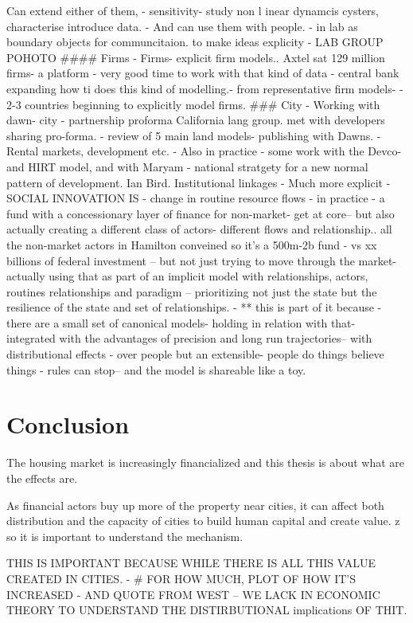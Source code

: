 \documentclass[]{article}
\begin{document}
Can extend either of them,
- sensitivity- study non l inear dynamcis cysters, characterise introduce data.
- And can use them with people. - in lab as boundary objects for communcitaion. to make ideas explicity - LAB GROUP POHOTO
#### Firms
- Firms- explicit firm models.. Axtel sat 129 million firms- a platform - very good time to work with that kind of data
- central bank expanding how ti does this kind of modelling.- from representative firm models- - 2-3 countries beginning to explicitly model firms.
### City
- Working with dawn- city - partnership proforma California lang group. met with developers sharing pro-forma. - review of 5 main land models- publishing with Dawns. - Rental markets, development etc.
- Also in practice - some work with the Devco- and HIRT model, and with Maryam - national stratgety for a new normal pattern of development. Ian Bird.
Institutional linkages
- Much more explicit - SOCIAL INNOVATION IS - change in routine resource flows
- in practice - a fund with a concessionary layer of finance for non-market- get at core-- but also actually creating a different class of actors- different flows and relationship.. all the non-market actors in Hamilton conveined so it's a 500m-2b fund - vs xx billions of federal investment -- but not just trying to move through the market- actually using that as part of an implicit model with relationships, actors, routines relationships and paradigm -- prioritizing not just the state but the resilience of the state and set of relationships.
- ** this is part of it because - there are a small set of canonical models- holding in relation with that- integrated with the advantages of precision and long run trajectories-- with distributional effects - over people but an extensible- people do things believe things - rules can stop-- and the model is shareable like a toy.

\section{Conclusion}


The housing market is increasingly financialized and this thesis is about what are the effects are. 

As financial actors buy up more of the property near cities, it can affect both distribution and the capacity of cities to build human capital and create value. z
so it is important to understand the mechanism.

THIS IS IMPORTANT BECAUSE WHILE THERE IS ALL THIS VALUE CREATED IN CITIES. - # FOR HOW MUCH, PLOT OF HOW IT'S INCREASED - AND QUOTE FROM WEST -- WE LACK IN ECONOMIC THEORY TO UNDERSTAND THE DISTIRBUTIONAL implications OF THIT.
\end{document}
